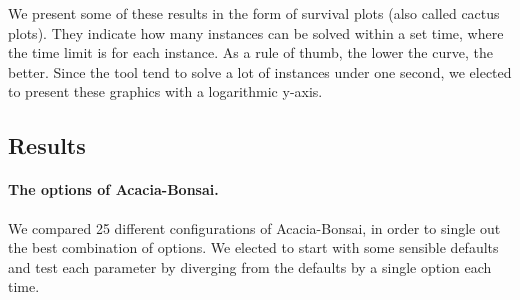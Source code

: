 \documentclass[runningheads,a4paper]{llncs}
\begin{document}
We present some of these results in the form of survival plots (also called
cactus plots).  They indicate how many instances can be solved within a set
time, where the time limit is for each instance.  As a rule of thumb, the lower
the curve, the better.  Since the tool tend to solve a lot of instances under
one second, we elected to present these graphics with a logarithmic y-axis.

\subsection{Results}

\paragraph{The options of Acacia-Bonsai.}  We compared 25 different
configurations of Acacia-Bonsai, in order to single out the best combination of
options.  We elected to start with some sensible defaults and test each
parameter by diverging from the defaults by a single option each time.
\end{document}

